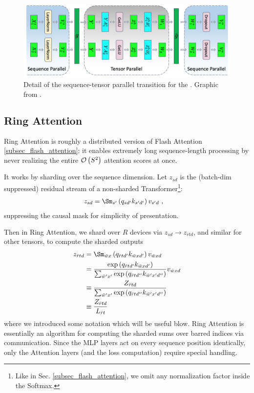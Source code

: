 \begin{figure}[ht]
	\centering
	\includegraphics[scale=.25]{figures/mlp-tensor-sequence-parallel.jpg}
	\caption{Detail of the sequence-tensor parallel transition for the  . Graphic from
		\cite{shoeybi2020megatronlm}. }
	\label{fig_tensor_seq_parallel_detail}
\end{figure}


\subsection{Ring Attention \label{subsec_ring_attention}}

Ring Attention \cite{liu2023ringattentionblockwisetransformers} is roughly a distributed version of
Flash Attention \ref{subsec_flash_attention}: it enables extremely long sequence-length processing
by never realizing the entire $ \mathcal{O} \left( S ^{ 2 } \right)  $ attention scores at once.

It works by sharding over the sequence dimension. Let $ z _{ sd } $ is the (batch-dim suppressed)
residual stream of a non-sharded Transformer\footnote{Like in Sec. \ref{subsec_flash_attention}, we
omit any normalization factor inside the Softmax.}:
\begin{align}
    z _{  sd } &= \Sm _{ s' } \left ( q _{ sd' } k _{ s'd' } \right ) v _{ s'd } \ ,
\end{align}
suppressing the causal mask for simplicity of presentation.

Then in Ring Attention, we shard over $ R $ devices via $ z _{ sd } \longrightarrow z _{ \bar{r}td }
$, and similar for other tensors, to compute the sharded outputs
\begin{align}
    z _{  \bar{r}td } &= \Sm _{ \bar{w} x  } \left ( q _{ \bar{r}t d' } k _{ \bar{w}x d' } \right ) v _{ \bar{w}x d }\nn
     &= \frac{ \exp \left ( q _{ \bar{r}t d' } k _{ \bar{w}x d' } \right ) }{ \sum _{ \bar{w}'x' } \exp \left (q _{ \bar{r}t d'' } k _{ \bar{w}'x' d'' }\right )  } v _{ \bar{w}xd }\nn
     &\equiv \frac{ Z _{\bar{r}td } }{   \sum _{ \bar{w}'x' } \exp  \left (q _{ \bar{r}t d'' } k _{ \bar{w}'x' d'' } \right ) }\nn
     &\equiv \frac{ Z _{\bar{r}td } }{L _{ \bar{r}t }}
\end{align}
where we introduced some notation which will be useful blow. Ring Attention is essentially an
algorithm for computing the sharded sums over barred indices via communication. Since the MLP layers
act on every sequence position identically, only the Attention layers (and the loss computation)
require special handling.

